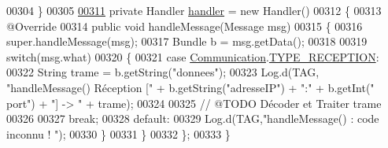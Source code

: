 \begin{DoxyCode}
00304     \}
00305 
\hyperlink{classcom_1_1lasalle_1_1meeting_1_1_i_h_m_meeting_af0a341dd3f520bba9d94b4b083ff75af}{00311}     \textcolor{keyword}{private} Handler \hyperlink{classcom_1_1lasalle_1_1meeting_1_1_i_h_m_meeting_af0a341dd3f520bba9d94b4b083ff75af}{handler} = \textcolor{keyword}{new} Handler()
00312     \{
00313         @Override
00314         \textcolor{keyword}{public} \textcolor{keywordtype}{void} handleMessage(Message msg)
00315         \{
00316             super.handleMessage(msg);
00317             Bundle b = msg.getData();
00318 
00319             \textcolor{keywordflow}{switch}(msg.what)
00320             \{
00321                 \textcolor{keywordflow}{case} \hyperlink{classcom_1_1lasalle_1_1meeting_1_1_communication}{Communication}.\hyperlink{classcom_1_1lasalle_1_1meeting_1_1_communication_a4997d801f57344fb4eea7924903c2d6c}{TYPE\_RECEPTION}:
00322                     String trame = b.getString(\textcolor{stringliteral}{"donnees"});
00323                     Log.d(TAG, \textcolor{stringliteral}{"handleMessage() Réception ["} + b.getString(\textcolor{stringliteral}{"adresseIP"}) + \textcolor{stringliteral}{":"} + b.getInt(\textcolor{stringliteral}{"
      port"}) + \textcolor{stringliteral}{"] -> "} + trame);
00324 
00325                     \textcolor{comment}{// @TODO Décoder et Traiter trame}
00326 
00327                     \textcolor{keywordflow}{break};
00328                 \textcolor{keywordflow}{default}:
00329                     Log.d(TAG,\textcolor{stringliteral}{"handleMessage() : code inconnu ! "});
00330             \}
00331         \}
00332     \};
00333 \}
\end{DoxyCode}
